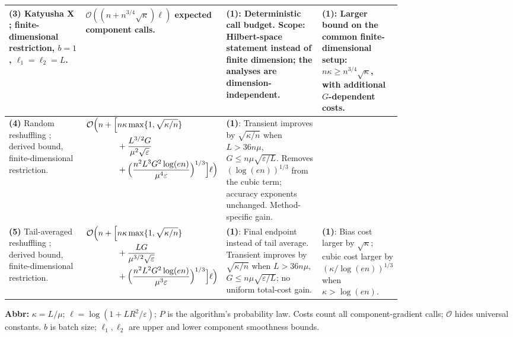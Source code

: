 \begin{table}[tp]
\begin{threeparttable}
\begin{tabularx}{\linewidth}{@{}>{\raggedright\arraybackslash}p{0.20\linewidth}>{\raggedright\arraybackslash}p{0.32\linewidth}>{\raggedright\arraybackslash}p{0.25\linewidth}>{\raggedright\arraybackslash}X@{}}
\midrule
\textbf{(3)} Katyusha X \citep[Cor.~4.4, v1]{qfsAllenZhu2018v1}; finite-dimensional restriction, $b=1$, $\ell_1=\ell_2=L$.
& $\mathcal{O}((n+n^{3/4}\sqrt{\kappa})\ell)$ expected component calls.
& \textbf{(1)}: Deterministic call budget. Scope: Hilbert-space statement instead of finite dimension; the analyses are dimension-independent.
& \textbf{(1)}: Larger bound on the common finite-dimensional setup: $n\kappa\ge n^{3/4}\sqrt{\kappa}$, with additional $G$-dependent costs. \\
\midrule
\textbf{(4)} Random reshuffling \citep[Thm.~2, App.~B.2--B.3, v2]{qfsAhnYunSra2020v2}; derived bound, finite-dimensional restriction.
& $\begin{aligned}[t]\mathcal{O}\Bigl(n+\Bigl[&n\kappa\max\{1,\sqrt{\kappa/n}\}\\ &+\frac{L^{3/2}G}{\mu^2\sqrt{\varepsilon}}\\ &+\Bigl(\frac{n^2L^3G^2\log(en)}{\mu^4\varepsilon}\Bigr)^{1/3}\Bigr]\ell\Bigr)\end{aligned}$
& \textbf{(1)}: Transient improves by $\sqrt{\kappa/n}$ when $L>36n\mu$, $G\le n\mu\sqrt{\varepsilon/L}$. Removes $(\log(en))^{1/3}$ from the cubic term; accuracy exponents unchanged. Method-specific gain.
& \\
\midrule
\textbf{(5)} Tail-averaged reshuffling \citep[Thm.~14, App.~C.1, v2]{qfsAhnYunSra2020v2}; derived bound, finite-dimensional restriction.
& $\begin{aligned}[t]\mathcal{O}\Bigl(n+\Bigl[&n\kappa\max\{1,\sqrt{\kappa/n}\}\\ &+\frac{LG}{\mu^{3/2}\sqrt{\varepsilon}}\\ &+\Bigl(\frac{n^2L^2G^2\log(en)}{\mu^3\varepsilon}\Bigr)^{1/3}\Bigr]\ell\Bigr)\end{aligned}$
& \textbf{(1)}: Final endpoint instead of tail average. Transient improves by $\sqrt{\kappa/n}$ when $L>36n\mu$, $G\le n\mu\sqrt{\varepsilon/L}$; no uniform total-cost gain.
& \textbf{(1)}: Bias cost larger by $\sqrt{\kappa}$; cubic cost larger by $(\kappa/\log(en))^{1/3}$ when $\kappa>\log(en)$. \\
\bottomrule
\end{tabularx}
\begin{tablenotes}[flushleft]\footnotesize
\item[] \textbf{Abbr:} $\kappa=L/\mu$; $\ell=\log(1+LR^2/\varepsilon)$; $P$ is the algorithm's probability law. Costs count all component-gradient calls; $\mathcal{O}$ hides universal constants. $b$ is batch size; $\ell_1,\ell_2$ are upper and lower component smoothness bounds.
\end{tablenotes}
\end{threeparttable}
\end{table}
\clearpage
